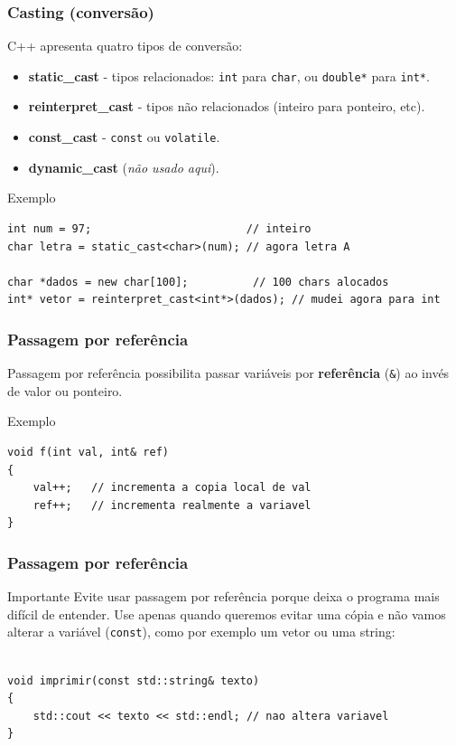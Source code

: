 \documentclass[xcolor={usenames,dvipsnames},10pt,compress,aspectratio=169]{beamer}
\begin{document}
\begin{frame}[fragile]
  \frametitle{Casting (conversão)}
C++ apresenta quatro tipos de conversão:
\begin{itemize}
\item \textbf{static\_cast} - tipos relacionados: \texttt{int} para \texttt{char},
ou \texttt{double*} para \texttt{int*}.
\item \textbf{reinterpret\_cast} - tipos não relacionados (inteiro para ponteiro, etc).
\item \textbf{const\_cast} - \texttt{const} ou \texttt{volatile}.
\item \textbf{dynamic\_cast} (\emph{não usado aqui}).
\end{itemize}
  \begin{block}{Exemplo}
\begin{lstlisting}
int num = 97;                        // inteiro
char letra = static_cast<char>(num); // agora letra A

char *dados = new char[100];          // 100 chars alocados
int* vetor = reinterpret_cast<int*>(dados); // mudei agora para int
\end{lstlisting}
  \end{block}
\end{frame}
\begin{frame}[fragile]
  \frametitle{Passagem por referência}
Passagem por referência possibilita passar variáveis por 
\textbf{referência} (\verb+&+) ao invés de valor ou ponteiro.
  \begin{block}{Exemplo}
\begin{lstlisting}
void f(int val, int& ref)
{
    val++;   // incrementa a copia local de val
    ref++;   // incrementa realmente a variavel
}
\end{lstlisting}
  \end{block}
%
\end{frame}
\begin{frame}[fragile]
  \frametitle{Passagem por referência}
\begin{alertblock}{Importante}
Evite usar passagem por referência porque deixa o programa
mais difícil de entender.
Use apenas quando queremos evitar uma cópia e não vamos alterar a variável (\verb+const+), 
como por exemplo um vetor ou uma string:
\begin{lstlisting}

void imprimir(const std::string& texto) 
{
    std::cout << texto << std::endl; // nao altera variavel
}
\end{lstlisting}
\end{alertblock}
\end{frame}
\end{document}
